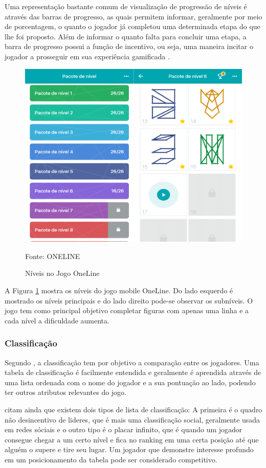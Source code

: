 		Uma representação bastante comum de visualização de progressão de níveis é através das barras de progresso, as quais permitem informar, geralmente por meio de porcentagem, o quanto o jogador já completou uma determinada etapa do que lhe foi proposto. Além de informar o quanto falta para concluir uma etapa, a barra de progresso possui a função de incentivo, ou seja, uma maneira incitar o jogador a prosseguir em sua experiência gamificada \cite{zichermann2011gamification}.
	
		\begin{figure}[H]
			\centering
			\includegraphics[width=0.5\linewidth]{img/niveisONELINE}
			\caption{Níveis no Jogo OneLine}
			Fonte: ONELINE
			\label{lvlOneLine}
		\end{figure}		
		A Figura \ref{lvlOneLine} mostra os níveis do jogo mobile OneLine.  Do lado esquerdo é mostrado os níveis principais e do lado direito pode-se observar os subníveis. O jogo tem como principal objetivo completar figuras com apenas uma linha e a cada nível a dificuldade aumenta.
		
		\subsubsection{Classificação}
		Segundo , a classificação tem por objetivo a comparação entre os jogadores. Uma tabela de classificação é facilmente entendida e geralmente é aprendida através de uma lista ordenada com o nome do jogador e a sua pontuação ao lado, podendo ter outros atributos relevantes do jogo.
		
		 citam ainda que existem dois tipos de lista de classificação: A primeira é o quadro não desincentivo de lideres, que é mais uma classificação social, geralmente usada em redes sóciais e o outro tipo é o placar infinito, que é quando um jogador consegue chegar a um certo nível e fica no ranking em uma certa posição até que alguém o supere e tire seu lugar. Um jogador que demonstre interesse profundo em um posicionamento da tabela pode ser considerado competitivo.
		
